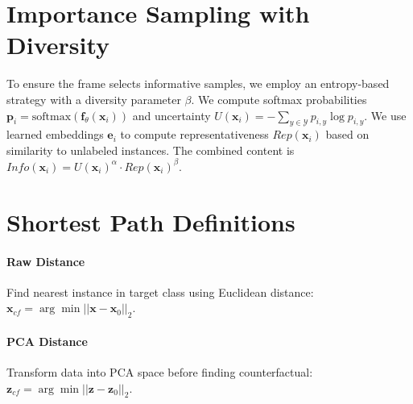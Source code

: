 \documentclass[sigconf,anonymous]{aamas}
\begin{document}
\balance
 


\appendix
\section{Importance Sampling with Diversity}
\label{appendix:al}
To ensure the frame selects informative samples, we employ an entropy-based strategy with a diversity parameter $\beta$. We compute softmax probabilities $\mathbf{p}_i = \text{softmax}(\mathbf{f}_\theta(\mathbf{x}_i))$ and uncertainty $U(\mathbf{x}_i) = -\sum_{y \in \mathcal{Y}} p_{i,y} \log p_{i,y}$. We use learned embeddings $\mathbf{e}_i$ to compute representativeness $Rep(\mathbf{x}_i)$ based on similarity to unlabeled instances. The combined content is $Info(\mathbf{x}_i) = U(\mathbf{x}_i)^\alpha \cdot Rep(\mathbf{x}_i)^\beta$.

\section{Shortest Path Definitions}
\paragraph{Raw Distance} Find nearest instance in target class using Euclidean distance: $\mathbf{x}_{cf} = \arg\min ||\mathbf{x} - \mathbf{x}_0||_2$.
\paragraph{PCA Distance} Transform data into PCA space before finding counterfactual: $\mathbf{z}_{cf} = \arg\min ||\mathbf{z} - \mathbf{z}_0||_2$.
\end{document}
